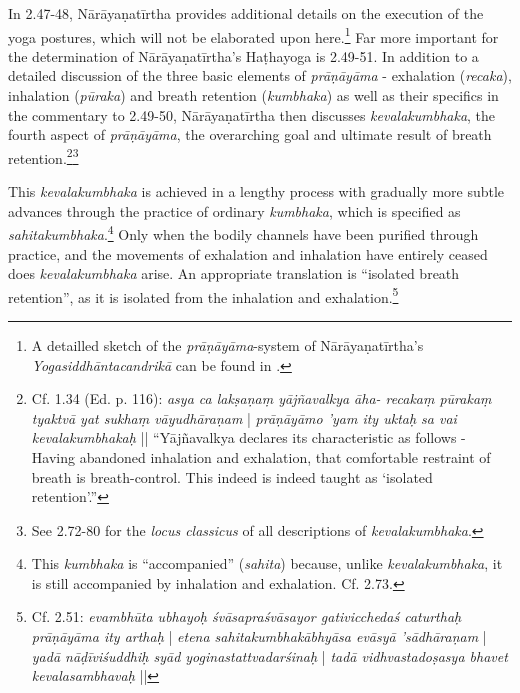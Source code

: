 In 2.47-48, Nārāyaṇatīrtha provides additional details on the execution of the yoga postures, which will not be elaborated upon here.\footnote{A detailled sketch of the \textit{prāṇāyāma}-system of Nārāyaṇatīrtha's \textit{Yogasiddhāntacandrikā} can be found in \citeauthor[2004: 209-18]{penna2004}.} Far more important for the determination of Nārāyaṇatīrtha's Haṭhayoga is 2.49-51. In addition to a detailed discussion of the three basic elements of \textit{prāṇāyāma} - exhalation (\textit{recaka}), inhalation (\textit{pūraka}) and breath retention (\textit{kumbhaka}) as well as their specifics in the commentary to 2.49-50, Nārāyaṇatīrtha then discusses \textit{kevalakumbhaka}, the fourth aspect of \textit{prāṇāyāma}, the overarching goal and ultimate result of breath retention.\footnote{Cf.  1.34 (Ed. p. 116): \textit{asya ca lakṣaṇaṃ yājñavalkya āha- recakaṃ pūrakaṃ tyaktvā yat sukhaṃ vāyudhāraṇam} | \textit{prāṇāyāmo 'yam ity uktaḥ sa vai kevalakumbhakaḥ} || ``Yājñavalkya declares its characteristic as follows - Having abandoned inhalation and exhalation, that comfortable restraint of breath is breath-control. This indeed is indeed taught as `isolated retention'.''}\footnote{See  2.72-80 for the \textit{locus classicus} of all descriptions of \textit{kevalakumbhaka}.} 

This \textit{kevalakumbhaka} is achieved in a lengthy process with gradually more subtle advances through the practice of ordinary \textit{kumbhaka}, which is specified as \textit{sahitakumbhaka}.\footnote{This \textit{kumbhaka} is ``accompanied'' (\textit{sahita}) because, unlike \textit{kevalakumbhaka}, it is still accompanied by inhalation and exhalation. Cf.  2.73.} Only when the bodily channels have been purified through practice, and the movements of exhalation and inhalation have entirely ceased does \textit{kevalakumbhaka} arise. An appropriate translation is ``isolated breath retention'', as it is isolated from the inhalation and exhalation.\footnote{Cf.  2.51: \textit{evambhūta ubhayoḥ śvāsapraśvāsayor gativicchedaś caturthaḥ prāṇāyāma ity arthaḥ} | \textit{etena sahitakumbhakābhyāsa evāsyā 'sādhāraṇam} | \textit{yadā nāḍīviśuddhiḥ syād yoginastattvadarśinaḥ} | \textit{tadā vidhvastadoṣasya bhavet kevalasambhavaḥ} ||}

